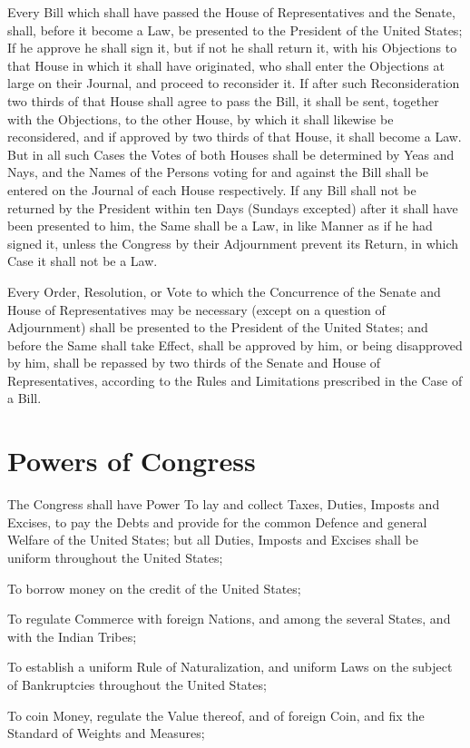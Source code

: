 \documentclass{constitution}
\begin{document}
Every Bill which shall have passed the House of Representatives and the Senate,
shall, before it become a Law, be presented to the President of the United States;
If he approve he shall sign it,
but if not he shall return it, with his Objections to that House in which it shall have originated,
who shall enter the Objections at large on their Journal, and proceed to reconsider it.
If after such Reconsideration two thirds of that House shall agree to pass the Bill,
it shall be sent, together with the Objections,
to the other House, by which it shall likewise be reconsidered,
and if approved by two thirds of that House, it shall become a Law.
But in all such Cases the Votes of both Houses shall be determined by Yeas and Nays,
and the Names of the Persons voting for and against the Bill
shall be entered on the Journal of each House respectively.
If any Bill shall not be returned by the President within ten Days (Sundays excepted)
after it shall have been presented to him,
the Same shall be a Law, in like Manner as if he had signed it,
unless the Congress by their Adjournment prevent its Return,
in which Case it shall not be a Law.

Every Order, Resolution, or Vote to which the Concurrence
of the Senate and House of Representatives may be necessary
(except on a question of Adjournment)
shall be presented to the President of the United States;
and before the Same shall take Effect, shall be approved by him,
or being disapproved by him,
shall be repassed by two thirds of the Senate and House of Representatives,
according to the Rules and Limitations prescribed in the Case of a Bill.

\section{Powers of Congress}
The Congress shall have Power
To lay and collect Taxes, Duties, Imposts and Excises,
to pay the Debts and provide for the common Defence and general Welfare of the United States;
but all Duties, Imposts and Excises shall be uniform throughout the United States;

To borrow money on the credit of the United States;

To regulate Commerce with foreign Nations,
and among the several States,
and with the Indian Tribes;

To establish a uniform Rule of Naturalization,
and uniform Laws on the subject of Bankruptcies
throughout the United States;

To coin Money, regulate the Value thereof, and of foreign Coin,
and fix the Standard of Weights and Measures;
\end{document}
